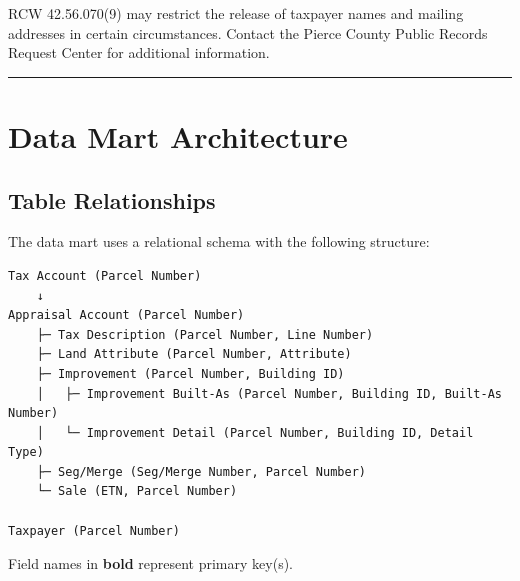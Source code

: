 \documentclass[
  english,
  letterpaper,
  DIV=11,
  numbers=noendperiod]{scrreprt}
\begin{document}
\begin{tcolorbox}[enhanced jigsaw, arc=.35mm, bottomrule=.15mm, bottomtitle=1mm, breakable, colback=white, colbacktitle=quarto-callout-note-color!10!white, colframe=quarto-callout-note-color-frame, coltitle=black, left=2mm, leftrule=.75mm, opacityback=0, opacitybacktitle=0.6, rightrule=.15mm, title=\textcolor{quarto-callout-note-color}{\faInfo}\hspace{0.5em}{Note}, titlerule=0mm, toprule=.15mm, toptitle=1mm]

RCW 42.56.070(9) may restrict the release of taxpayer names and mailing
addresses in certain circumstances. Contact the Pierce County Public
Records Request Center for additional information.

\end{tcolorbox}

\begin{center}\rule{0.5\linewidth}{0.5pt}\end{center}

\section{Data Mart Architecture}\label{data-mart-architecture}

\subsection{Table Relationships}\label{table-relationships}

The data mart uses a relational schema with the following structure:

\begin{verbatim}
Tax Account (Parcel Number)
    ↓
Appraisal Account (Parcel Number)
    ├─ Tax Description (Parcel Number, Line Number)
    ├─ Land Attribute (Parcel Number, Attribute)
    ├─ Improvement (Parcel Number, Building ID)
    │   ├─ Improvement Built-As (Parcel Number, Building ID, Built-As Number)
    │   └─ Improvement Detail (Parcel Number, Building ID, Detail Type)
    ├─ Seg/Merge (Seg/Merge Number, Parcel Number)
    └─ Sale (ETN, Parcel Number)

Taxpayer (Parcel Number)
\end{verbatim}

\begin{tcolorbox}[enhanced jigsaw, arc=.35mm, bottomrule=.15mm, bottomtitle=1mm, breakable, colback=white, colbacktitle=quarto-callout-tip-color!10!white, colframe=quarto-callout-tip-color-frame, coltitle=black, left=2mm, leftrule=.75mm, opacityback=0, opacitybacktitle=0.6, rightrule=.15mm, title=\textcolor{quarto-callout-tip-color}{\faLightbulb}\hspace{0.5em}{Key}, titlerule=0mm, toprule=.15mm, toptitle=1mm]

Field names in \textbf{bold} represent primary key(s).

\end{tcolorbox}
\end{document}
